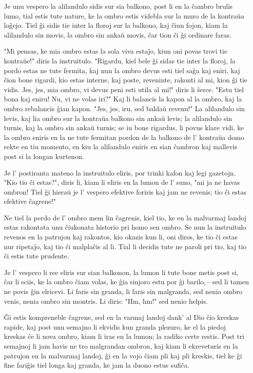 \documentclass[ngerman,12pt,twoside]{book}
\begin{document}
Je unu vespero la alilandulo sidis sur sia balkono, post li en la ĉambro brulis lumo, tial estis tute nature, ke la ombro estis videbla sur la muro de la kontraŭa loĝejo. Tiel ĝi sidis tie inter la floroj sur la balkono, kaj ĉiun fojon, kiam la alilandulo sin movis, la ombro sin ankaŭ movis, ĉar tion ĉi ĝi ordinare faras.

"Mi pensas, ke mia ombro estas la sola viva estaĵo, kiun oni povas trovi tie kontraŭe!" diris la instruitulo. "Rigardu, kiel bele ĝi sidas tie inter la floroj, la pordo estas ne tute fermita, kaj nun la ombro devus esti tiel saĝa kaj eniri, kaj ĉion bone rigardi, kio estas interne, kaj poste, reveninte, rakonti al mi, kion ĝi tie vidis. Jes, jes, mia ombro, vi devus peni esti utila al mi!" diris li ŝerce. "Estu tiel bona kaj eniru! Nu, vi ne volas iri?" Kaj li balancis la kapon al la ombro, kaj la ombro rebalancis ĝian kapon. "Jes, jes, iru, sed baldaŭ revenu!" La alilandulo sin levis, kaj lia ombro sur la kontraŭa balkono sin ankaŭ levis; la alilandulo sin turnis, kaj la ombro sin ankaŭ turnis; se iu bone rigardus, li povus klare vidi, ke la ombro eniris en la ne tute fermitan pordon de la balkono de l' kontraŭa domo rekte en tiu momento, en kiu la alilandulo eniris en sian ĉambron kaj mallevis post si la longan kurtenon.

Je l' postiranta mateno la instruitulo eliris, por trinki kafon kaj legi gazetojn. "Kio tio ĉi estas?", diris li, kiam li eliris en la lumon de l' suno, "mi ja ne havas ombron! Tiel ĝi hieraŭ je l' vespero efektive foriris kaj jam ne revenis; tio ĉi estas efektive ĉagrene!"

Ne tiel la perdo de l' ombro mem lin ĉagrenis, kiel tio, ke en la malvarmaj landoj estas rakontata unu ĉiukonata historio pri homo sen ombro. Se nun la instruitulo revenos en la patrujon kaj rakontos, kio okazis kun li, oni diros, ke tio ĉi estas nur ripetaĵo, kaj tio ĉi malplaĉis al li. Tial li decidis tute ne paroli pri tio, kaj tio ĉi estis tute prudente.

Je l' vespero li ree eliris sur sian balkonon, la lumon li tute bone metis post si, ĉar li sciis, ke la ombro ĉiam volas, ke ĝia sinjoro estu por ĝi barilo,---sed li tamen ne povis ĝin elricevi. Li faris sin granda, li faris sin malgranda, sed nenia ombro venis, nenia ombro sin montris. Li diris: "Hm, hm!" sed nenio helpis.

Ĝi estis kompreneble ĉagrene, sed en la varmaj landoj dank' al Dio ĉio kreskas rapide, kaj post unu semajno li ekvidis kun granda plezuro, ke el la piedoj kreskas ĉe li nova ombro, kiam li iras en la lumon; la radiko certe restis. Post tri semajnoj li jam havis ne tro malgrandan ombron, kaj kiam li ekreveturis en la patrujon en la malvarmaj landoj, ĝi en la vojo ĉiam pli kaj pli kreskis, tiel ke ĝi fine fariĝis tiel longa kaj granda, ke jam la duono estus sufiĉa.
\end{document}
